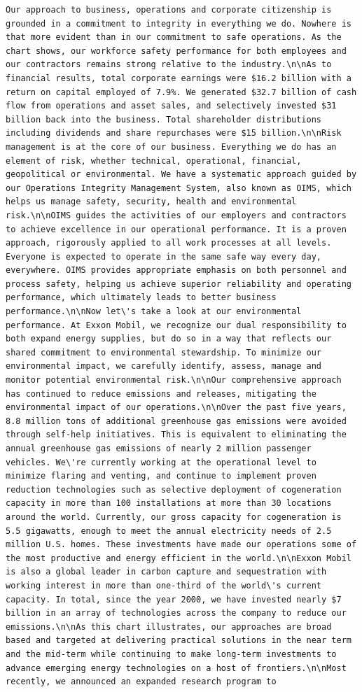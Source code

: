 \documentclass[
  letterpaper,
  DIV=11,
  numbers=noendperiod]{scrreprt}
\begin{document}
\begin{verbatim}
Our approach to business, operations and corporate citizenship is grounded in a commitment to integrity in everything we do. Nowhere is that more evident than in our commitment to safe operations. As the chart shows, our workforce safety performance for both employees and our contractors remains strong relative to the industry.\n\nAs to financial results, total corporate earnings were $16.2 billion with a return on capital employed of 7.9%. We generated $32.7 billion of cash flow from operations and asset sales, and selectively invested $31 billion back into the business. Total shareholder distributions including dividends and share repurchases were $15 billion.\n\nRisk management is at the core of our business. Everything we do has an element of risk, whether technical, operational, financial, geopolitical or environmental. We have a systematic approach guided by our Operations Integrity Management System, also known as OIMS, which helps us manage safety, security, health and environmental risk.\n\nOIMS guides the activities of our employers and contractors to achieve excellence in our operational performance. It is a proven approach, rigorously applied to all work processes at all levels. Everyone is expected to operate in the same safe way every day, everywhere. OIMS provides appropriate emphasis on both personnel and process safety, helping us achieve superior reliability and operating performance, which ultimately leads to better business performance.\n\nNow let\'s take a look at our environmental performance. At Exxon Mobil, we recognize our dual responsibility to both expand energy supplies, but do so in a way that reflects our shared commitment to environmental stewardship. To minimize our environmental impact, we carefully identify, assess, manage and monitor potential environmental risk.\n\nOur comprehensive approach has continued to reduce emissions and releases, mitigating the environmental impact of our operations.\n\nOver the past five years, 8.8 million tons of additional greenhouse gas emissions were avoided through self-help initiatives. This is equivalent to eliminating the annual greenhouse gas emissions of nearly 2 million passenger vehicles. We\'re currently working at the operational level to minimize flaring and venting, and continue to implement proven reduction technologies such as selective deployment of cogeneration capacity in more than 100 installations at more than 30 locations around the world. Currently, our gross capacity for cogeneration is 5.5 gigawatts, enough to meet the annual electricity needs of 2.5 million U.S. homes. These investments have made our operations some of the most productive and energy efficient in the world.\n\nExxon Mobil is also a global leader in carbon capture and sequestration with working interest in more than one-third of the world\'s current capacity. In total, since the year 2000, we have invested nearly $7 billion in an array of technologies across the company to reduce our emissions.\n\nAs this chart illustrates, our approaches are broad based and targeted at delivering practical solutions in the near term and the mid-term while continuing to make long-term investments to advance emerging energy technologies on a host of frontiers.\n\nMost recently, we announced an expanded research program to 
\end{verbatim}
\end{document}
